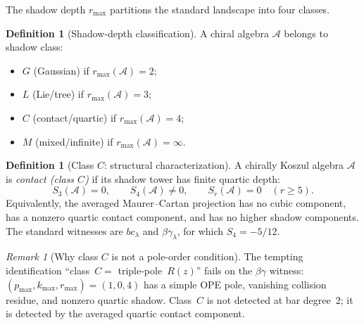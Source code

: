 \documentclass[11pt]{article}
\theoremstyle{definition}
\newtheorem{definition}[theorem]{Definition}
\theoremstyle{remark}
\newtheorem{remark}[theorem]{Remark}
\newcommand{\cA}{\mathcal{A}}
\numberwithin{equation}{section}
\begin{document}
The shadow depth $r_{\max}$ partitions the standard landscape into four
classes.

\begin{definition}[Shadow-depth classification]\label{def:four-classes}
A chiral algebra $\cA$ belongs to shadow class:
\begin{itemize}[nosep]
\item $G$ (Gaussian) if $r_{\max}(\cA) = 2$;
\item $L$ (Lie/tree) if $r_{\max}(\cA) = 3$;
\item $C$ (contact/quartic) if $r_{\max}(\cA) = 4$;
\item $M$ (mixed/infinite) if $r_{\max}(\cA) = \infty$.
\end{itemize}
\end{definition}

\begin{definition}[Class $C$: structural characterization]\label{def:class-C-structural}
A chirally Koszul algebra $\cA$ is \emph{contact (class $C$)} if its
shadow tower has finite quartic depth:
\[
S_3(\cA)=0,\qquad S_4(\cA)\neq0,\qquad S_r(\cA)=0\quad(r\geq5).
\]
Equivalently, the averaged Maurer--Cartan projection has no cubic
component, has a nonzero quartic contact component, and has no higher
shadow components. The standard witnesses are $bc_\lambda$ and
$\beta\gamma_\lambda$, for which $S_4=-5/12$.
\end{definition}

\begin{remark}[Why class $C$ is not a pole-order condition]
\label{rem:class-C-not-pole-order}
The tempting identification ``class~$C = $ triple-pole~$R(z)$''
fails on the $\beta\gamma$ witness: $(p_{\max}, k_{\max}, r_{\max}) =
(1, 0, 4)$ has a simple OPE pole, vanishing collision residue, and
nonzero quartic shadow. Class~$C$ is not detected at bar degree~$2$;
it is detected by the averaged quartic contact component.
\end{remark}
\end{document}
